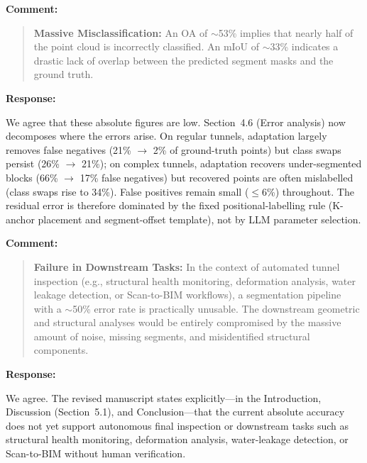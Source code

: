 \documentclass[11pt,a4paper]{article}
\newenvironment{commentblock}{%
  \par\smallskip\noindent\textbf{Comment:}\par
  \begin{quote}\itshape\color{black}
}{%
  \end{quote}\smallskip
}
\newenvironment{responseblock}{%
  \par\smallskip\noindent\textbf{Response:}\par
  \begingroup\color{responsegreen}
}{%
  \endgroup\smallskip
}
\begin{document}
\begin{commentblock}
\textbf{Massive Misclassification:} An OA of $\sim$53\% implies that nearly half of the point cloud is incorrectly classified. An mIoU of $\sim$33\% indicates a drastic lack of overlap between the predicted segment masks and the ground truth.
\end{commentblock}
\begin{responseblock}
We agree that these absolute figures are low. Section~4.6 (Error analysis) now decomposes where the errors arise. On regular tunnels, adaptation largely removes false negatives (21\% $\rightarrow$ 2\% of ground-truth points) but class swaps persist (26\% $\rightarrow$ 21\%); on complex tunnels, adaptation recovers under-segmented blocks (66\% $\rightarrow$ 17\% false negatives) but recovered points are often mislabelled (class swaps rise to 34\%). False positives remain small ($\leq$6\%) throughout. The residual error is therefore dominated by the fixed positional-labelling rule (K-anchor placement and segment-offset template), not by LLM parameter selection.
\end{responseblock}

\begin{commentblock}
\textbf{Failure in Downstream Tasks:} In the context of automated tunnel inspection (e.g., structural health monitoring, deformation analysis, water leakage detection, or Scan-to-BIM workflows), a segmentation pipeline with a $\sim$50\% error rate is practically unusable. The downstream geometric and structural analyses would be entirely compromised by the massive amount of noise, missing segments, and misidentified structural components.
\end{commentblock}
\begin{responseblock}
We agree. The revised manuscript states explicitly---in the Introduction, Discussion (Section~5.1), and Conclusion---that the current absolute accuracy does not yet support autonomous final inspection or downstream tasks such as structural health monitoring, deformation analysis, water-leakage detection, or Scan-to-BIM without human verification.
\end{responseblock}
\end{document}
